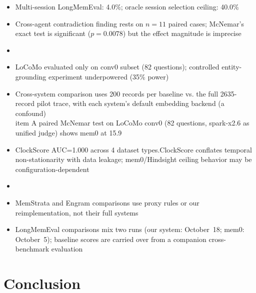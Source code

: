 \documentclass{llncs}
\begin{document}
\begin{itemize}
\item Multi-session LongMemEval: 4.0\%; oracle session selection ceiling: 40.0\%
\item Cross-agent contradiction finding rests on $n{=}11$ paired cases; McNemar's exact test is significant ($p{=}0.0078$) but the effect magnitude is imprecise
\item \item LoCoMo evaluated only on conv0 subset (82 questions); controlled entity-grounding experiment underpowered (35\% power)
\item Cross-system comparison uses 200 records per baseline vs. the full 2{}635-record pilot trace, with each system's default embedding backend (a confound)
\\item A paired McNemar test on LoCoMo conv0 (82 questions, spark-x2.6 as unified judge) shows mem0 at 15.9\\%
\item  ClockScore AUC=1.000 across 4 dataset types.ClockScore conflates temporal non-stationarity with data leakage; mem0/Hindsight ceiling behavior may be configuration-dependent
\item \item MemStrata and Engram comparisons use proxy rules or our reimplementation, not their full systems
\item LongMemEval comparisons mix two runs (our system: October~18; mem0: October~5); baseline scores are carried over from a companion cross-benchmark evaluation
\end{itemize}

\enlargethispage{15\baselineskip}
\section{Conclusion}
\end{document}
